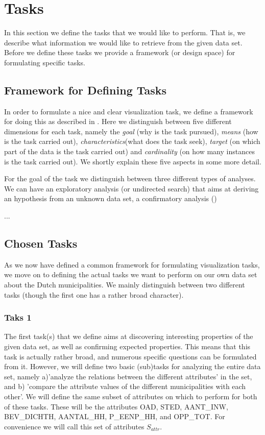 \section{Tasks}

In this section we define the tasks that we would like to perform. That is, we describe what information we would like to retrieve from the given data set. Before we define these tasks we provide a framework (or design space) for formulating specific tasks.

\subsection{Framework for Defining Tasks}
In order to formulate a nice and clear visualization task, we define a framework for doing this as described in \cite{schulz2013design}. Here we distinguish between five different dimensions for each task, namely the \textit{goal} (why is the task pursued), \textit{means} (how is the task carried out), \textit{characteristics}(what does the task seek), \textit{target} (on which part of the data is the task carried out) and \textit{cardinality} (on how many instances is the task carried out). We shortly explain these five aspects in some more detail.

For the goal of the task we distinguish between three different types of analyses. We can have an exploratory analysis (or undirected search) that aims at deriving an hypothesis from an unknown data set, a confirmatory analysis ()

\todo{!}...

\subsection{Chosen Tasks}
As we now have defined a common framework for formulating visualization tasks, we move on to defining the actual tasks we want to perform on our own data set about the Dutch municipalities. We mainly distinguish between two different tasks (though the first one has a rather broad character).

\subsubsection{Taks 1}
The first task(s) that we define aims at discovering interesting properties of the given data set, as well as confirming expected properties. This means that this task is actually rather broad, and numerous specific questions can be formulated from it. However, we will define two basic (sub)tasks for analyzing the entire data set, namely a)'analyze the relations between the different attributes' in the set, and b) 'compare the attribute values of the different municipalities with each other'. We will define the same subset of attributes on which to perform for both of these tasks. These will be the attributes OAD, STED, AANT_INW, BEV_DICHTH, AANTAL_HH, P_EENP_HH, and OPP_TOT. For convenience we will call this set of attributes $S_{attr}$.


